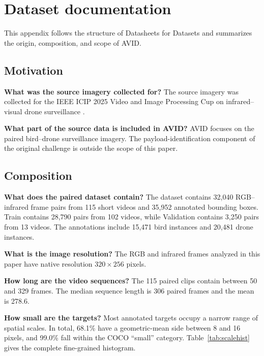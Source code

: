 \documentclass[10pt]{article}
\newcommand{\dataset}{\textsc{AVID}}
\begin{document}



\clearpage
\appendix


\section{Dataset documentation}
\label{app:datasheet}

This appendix follows the structure of Datasheets for Datasets \citep{gebru2021datasheets} and summarizes the origin, composition, and scope of \dataset{}.

\subsection{Motivation}

\textbf{What was the source imagery collected for?}
The source imagery was collected for the IEEE ICIP 2025 Video and Image Processing Cup on infrared--visual drone surveillance \citep{ieeevipcup2025}.

\textbf{What part of the source data is included in \dataset{}?}
\dataset{} focuses on the paired bird--drone surveillance imagery. The payload-identification component of the original challenge is outside the scope of this paper.

\subsection{Composition}

\textbf{What does the paired dataset contain?}
The dataset contains 32,040 RGB--infrared frame pairs from 115 short videos and 35,952 annotated bounding boxes. Train contains 28,790 pairs from 102 videos, while Validation contains 3,250 pairs from 13 videos. The annotations include 15,471 bird instances and 20,481 drone instances.

\textbf{What is the image resolution?}
The RGB and infrared frames analyzed in this paper have native resolution $320\times256$ pixels.

\textbf{How long are the video sequences?}
The 115 paired clips contain between 50 and 329 frames. The median sequence length is 306 paired frames and the mean is 278.6.

\textbf{How small are the targets?}
Most annotated targets occupy a narrow range of spatial scales. In total, 68.1\% have a geometric-mean side between 8 and 16 pixels, and 99.0\% fall within the COCO ``small'' category. Table~\ref{tab:scalehist} gives the complete fine-grained histogram.
\end{document}
